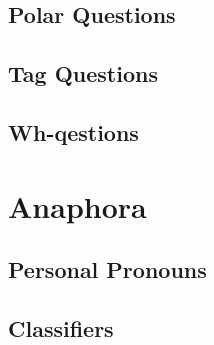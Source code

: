 \documentclass[11pt,a4paper,titlepage]{article}
\begin{document}
		\subsection{Polar Questions}
			\lipsum[1]
		\subsection{Tag Questions}
		\subsection{Wh-qestions}
	\section{Anaphora}
		\subsection{Personal Pronouns}
		\subsection{Classifiers}
\end{document}
